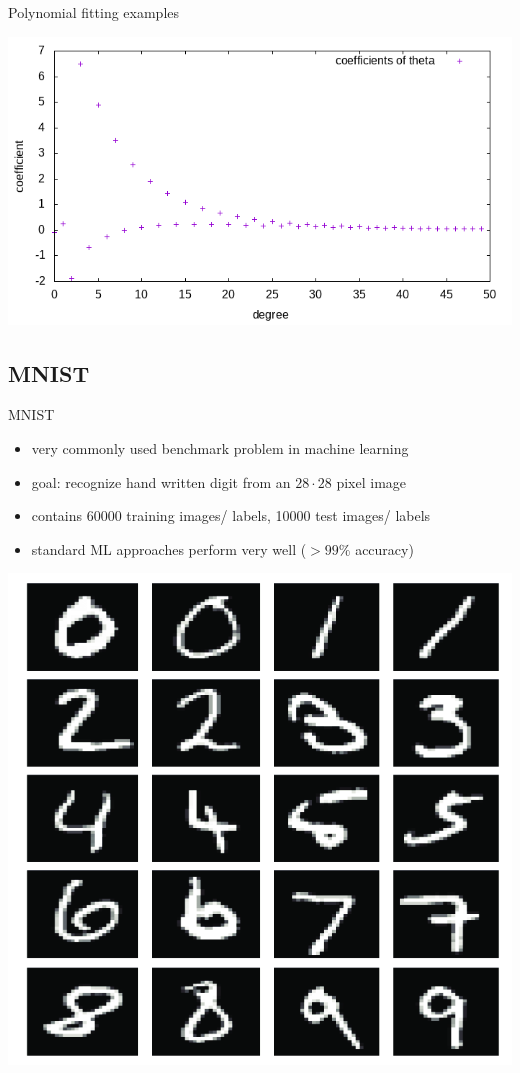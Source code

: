 \documentclass{beamer}
\begin{document}
\begin{frame}{Polynomial fitting examples}
\begin{center}
\includegraphics[width=\textwidth]{source/theta_coefficients_1.png}
\end{center}
\end{frame}

\subsection{MNIST}

\begin{frame}{MNIST}
\begin{itemize}
	\item very commonly used benchmark problem in machine learning
	\item goal: recognize hand written digit from an \(28 \cdot 28\) pixel image
	\item contains 60000 training images/ labels, 10000 test images/ labels
	\item standard ML approaches perform very well (\(> 99 \%\) accuracy)
\end{itemize}
\begin{center}
	\includegraphics[scale=0.15]{source/mnist.png}
\end{center}
\end{frame}
\end{document}
